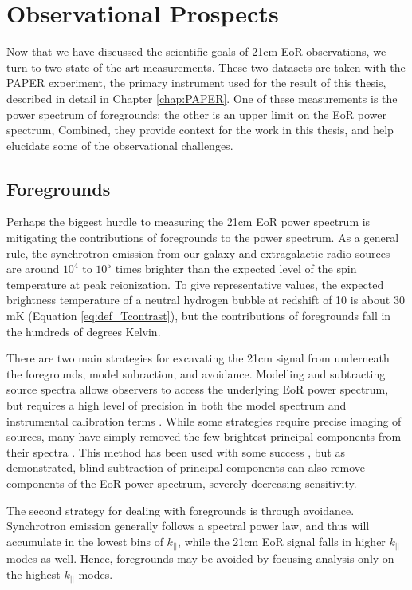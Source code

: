 \section{Observational Prospects}
\label{sec:StatusQuo}

Now that we have discussed the scientific goals of 21cm EoR observations, we turn to two state of the
art measurements. These two datasets are taken with the PAPER experiment, the primary instrument
used for the result of this thesis, described in detail in Chapter \ref{chap:PAPER}. One of these
measurements is the power spectrum of foregrounds; the other is an upper limit on the EoR power
spectrum, Combined, they provide context for the work in this thesis, and help elucidate some of the observational 
challenges.

\subsection{Foregrounds}

Perhaps the biggest hurdle to measuring the 21cm EoR power spectrum is mitigating the
contributions of foregrounds to the power spectrum. As a general rule, the synchrotron emission 
from our galaxy and extragalactic radio sources are around $10^4$ to $10^5$ times brighter 
than the expected level of the spin temperature at peak reionization. To give representative values, 
the expected brightness temperature of a neutral hydrogen bubble at redshift of 10 is about 30 mK 
(Equation \ref{eq:def_Tcontrast}), but the contributions of foregrounds fall in the hundreds of
degrees Kelvin. 

There are two main strategies for excavating the 21cm signal from underneath the foregrounds,
model subraction, and avoidance. Modelling and subtracting source spectra allows observers to
access the underlying EoR power spectrum, but requires a high level of precision in both the model
spectrum and instrumental calibration terms \cite[][e.g.]{Bowman2009,Datta2010}. While some
strategies require precise imaging of sources, many have simply removed the few brightest principal
components from their spectra \cite[][e.g.]{Liu2009b}. This method has been used with some success
\cite{Dillon2014,Paciga2013}, but as \citet{Paciga2013} demonstrated, blind subtraction of principal
components can also remove components of the EoR power spectrum, severely decreasing sensitivity. 

The second strategy for dealing with foregrounds is through avoidance. Synchrotron emission
generally follows a spectral power law, and thus will accumulate in the lowest bins of $k_{||}$,
while the 21cm EoR signal falls in higher $k_{||}$ modes as well. Hence, foregrounds may be avoided
by focusing analysis only on the highest $k_{||}$ modes.

